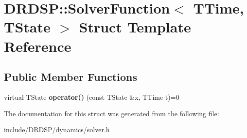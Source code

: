 \hypertarget{struct_d_r_d_s_p_1_1_solver_function}{\section{D\-R\-D\-S\-P\-:\-:Solver\-Function$<$ T\-Time, T\-State $>$ Struct Template Reference}
\label{struct_d_r_d_s_p_1_1_solver_function}
}
\subsection*{Public Member Functions}
\begin{DoxyCompactItemize}
\item 
\hypertarget{struct_d_r_d_s_p_1_1_solver_function_a4ced40af4a699021bc38a121e65babb5}{virtual T\-State {\bfseries operator()} (const T\-State \&x, T\-Time t)=0}\label{struct_d_r_d_s_p_1_1_solver_function_a4ced40af4a699021bc38a121e65babb5}

\end{DoxyCompactItemize}


The documentation for this struct was generated from the following file\-:\begin{DoxyCompactItemize}
\item 
include/\-D\-R\-D\-S\-P/dynamics/solver.\-h\end{DoxyCompactItemize}
